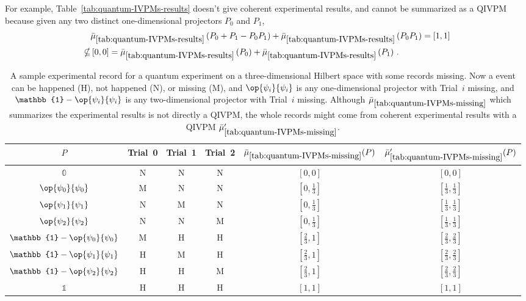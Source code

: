 \documentclass[english,reprint, aps, prl,superscriptaddress, showpacs,
showkeys, longbibliography, amsmath, amssymb, floatfix]{revtex4-1}
\theoremstyle{plain}
\theoremstyle{definition}
\newcommand{\imposs}{\ensuremath{\left[0,0\right]}}
\newcommand{\necess}{\ensuremath{\left[1,1\right]}}
\newcommand{\proj}[1]{\op{#1}{#1}}
\newcommand{\happen}{\text{H}}
\newcommand{\notHappen}{\text{N}}
\newcommand{\missing}{\text{M}}
\begin{document}
For example, Table~\ref{tab:quantum-IVPMs-results} doesn't give
coherent experimental results, and cannot be summarized as a QIVPM
because given any two distinct one-dimensional projectors $P_{0}$
and $P_{1}$, 
\begin{equation}
\begin{aligned} & \bar{\mu}_{\ref{tab:quantum-IVPMs-results}}\left(P_{0}+P_{1}-P_{0}P_{1}\right)+\bar{\mu}_{\ref{tab:quantum-IVPMs-results}}\left(P_{0}P_{1}\right)=\necess\\
\nsubseteq & \imposs=\bar{\mu}_{\ref{tab:quantum-IVPMs-results}}\left(P_{0}\right)+\bar{\mu}_{\ref{tab:quantum-IVPMs-results}}\left(P_{1}\right)\,.
\end{aligned}
\end{equation}

\begin{table}
\noindent \centering{}\caption{\label{tab:quantum-IVPMs-missing}A sample experimental record for
a quantum experiment on a three-dimensional Hilbert space with some
records missing. Now a event can be happened ($\happen$), not happened
($\notHappen$), or missing ($\missing$), and $\proj{\psi_{i}}$
is any one-dimensional projector with Trial~$i$ missing, and $\mathbb{1}-\proj{\psi_{i}}$
is any two-dimensional projector with Trial~$i$ missing. Although
$\bar{\mu}_{\ref{tab:quantum-IVPMs-missing}}$ which summarizes the
experimental results is not directly a QIVPM, the whole records might
come from coherent experimental results with a QIVPM $\bar{\mu}_{\ref{tab:quantum-IVPMs-missing}}'$.}
\begin{tabular}{cccccc}
\toprule 
\addlinespace
$P$  & Trial~0 & Trial~1 & Trial~2 & $\bar{\mu}_{\ref{tab:quantum-IVPMs-missing}}(P)$ & $\bar{\mu}_{\ref{tab:quantum-IVPMs-missing}}'(P)$\tabularnewline
\midrule
\midrule 
\addlinespace
$\mathbb{0}$  & $\notHappen$ & $\notHappen$ & $\notHappen$ & $\imposs$ & $\imposs$\tabularnewline
\midrule 
\addlinespace
$\proj{\psi_{0}}$  & $\missing$ & $\notHappen$ & $\notHappen$ & $\left[0,\frac{1}{3}\right]$ & $\left[\frac{1}{3},\frac{1}{3}\right]$\tabularnewline
\midrule 
\addlinespace
$\proj{\psi_{1}}$  & $\notHappen$ & $\missing$ & $\notHappen$ & $\left[0,\frac{1}{3}\right]$ & $\left[\frac{1}{3},\frac{1}{3}\right]$\tabularnewline
\midrule 
\addlinespace
$\proj{\psi_{2}}$  & $\notHappen$ & $\notHappen$ & $\missing$ & $\left[0,\frac{1}{3}\right]$ & $\left[\frac{1}{3},\frac{1}{3}\right]$\tabularnewline
\midrule 
\addlinespace
$\mathbb{1}-\proj{\psi_{0}}$  & $\missing$ & $\happen$ & $\happen$ & $\left[\frac{2}{3},1\right]$ & $\left[\frac{2}{3},\frac{2}{3}\right]$\tabularnewline
\midrule 
\addlinespace
$\mathbb{1}-\proj{\psi_{1}}$  & $\happen$ & $\missing$ & $\happen$ & $\left[\frac{2}{3},1\right]$ & $\left[\frac{2}{3},\frac{2}{3}\right]$\tabularnewline
\midrule 
\addlinespace
$\mathbb{1}-\proj{\psi_{2}}$  & $\happen$ & $\happen$ & $\missing$ & $\left[\frac{2}{3},1\right]$ & $\left[\frac{2}{3},\frac{2}{3}\right]$\tabularnewline
\midrule 
\addlinespace
$\mathbb{1}$  & $\happen$ & $\happen$ & $\happen$ & $\necess$ & $\necess$\tabularnewline
\bottomrule
\end{tabular}
\end{table}
\end{document}
